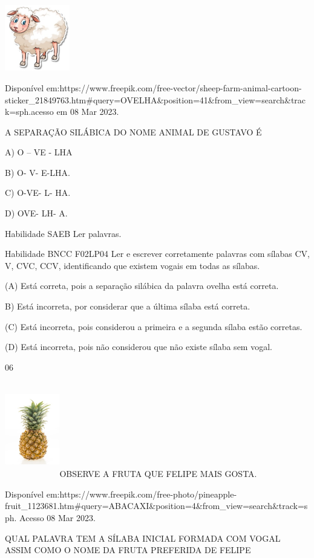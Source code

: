 {{{{{{\includegraphics[width=1.11458in,height=1.13889in]{media/image142.jpeg}

Disponível
em:https://www.freepik.com/free-vector/sheep-farm-animal-cartoon-sticker\_21849763.htm\#query=OVELHA\&position=41\&from\_view=search\&track=sph.acesso
em 08 Mar 2023.

A SEPARAÇÃO SILÁBICA DO NOME ANIMAL DE GUSTAVO É

A) O -- VE - LHA

B) O- V- E-LHA.

C) O-VE- L- HA.

D) OVE- LH- A.

Habilidade SAEB Ler palavras.

Habilidade BNCC F02LP04 Ler e escrever corretamente palavras com sílabas
CV, V, CVC, CCV, identificando que existem vogais em todas as sílabas.

(A) Está correta, pois a separação silábica da palavra ovelha está
correta.

B) Está incorreta, por considerar que a última sílaba está correta.

(C) Está incorreta, pois considerou a primeira e a segunda sílaba estão
corretas.

(D) Está incorreta, pois não considerou que não existe sílaba sem vogal.

\num{06}

\includegraphics[width=0.94236in,height=1.64306in]{media/image143.jpeg}OBSERVE
A FRUTA QUE FELIPE MAIS GOSTA.

Disponível
em:https://www.freepik.com/free-photo/pineapple-fruit\_1123681.htm\#query=ABACAXI\&position=4\&from\_view=search\&track=sph.
Acesso 08 Mar 2023.

\protect\hypertarget{_Hlk129270648}{}{}QUAL PALAVRA TEM A SÍLABA INICIAL
FORMADA COM VOGAL ASSIM COMO O NOME DA FRUTA PREFERIDA DE FELIPE

}}}}}}
